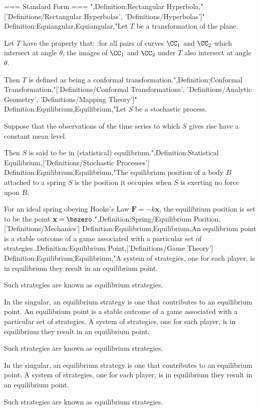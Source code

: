 === Standard Form ===
",Definition:Rectangular Hyperbola,"['Definitions/Rectangular Hyperbolas', 'Definitions/Hyperbolas']"
Definition:Equiangular,Equiangular,"Let $T$ be a transformation of the plane.

Let $T$ have the property that:
:for all pairs of curves $\CC_1$ and $\CC_2$ which intersect at angle $\theta$, the images of $\CC_1$ and $\CC_2$ under $T$ also intersect at angle $\theta$.

Then $T$ is defined as being a conformal transformation.",Definition:Conformal Transformation,"['Definitions/Conformal Transformations', 'Definitions/Analytic Geometry', 'Definitions/Mapping Theory']"
Definition:Equilibrium,Equilibrium,"Let $S$ be a stochastic process.

Suppose that the observations of the time series to which $S$ gives rise have a constant mean level.

Then $S$ is said to be in (statistical) equilibrium.",Definition:Statistical Equilibrium,['Definitions/Stochastic Processes']
Definition:Equilibrium,Equilibrium,"The equilibrium position of a body $B$ attached to a spring $S$ is the position it occupies when $S$ is exerting no force upon $B$.

For an ideal spring obeying Hooke's Law $\mathbf F = -k \mathbf x$, the equilibrium position is set to be the point $\mathbf x = \bszero$.",Definition:Spring/Equilibrium Position,['Definitions/Mechanics']
Definition:Equilibrium,Equilibrium,An equilibrium point is a stable outcome of a game associated with a particular set of strategies.,Definition:Equilibrium Point,['Definitions/Game Theory']
Definition:Equilibrium,Equilibrium,"A system of strategies, one for each player, is in equilibrium  they result in an equilibrium point.

Such strategies are known as equilibrium strategies.


In the singular, an equilibrium strategy is one that contributes to an equilibrium point.
An equilibrium point is a stable outcome of a game associated with a particular set of strategies.
A system of strategies, one for each player, is in equilibrium  they result in an equilibrium point.

Such strategies are known as equilibrium strategies.


In the singular, an equilibrium strategy is one that contributes to an equilibrium point.
A system of strategies, one for each player, is in equilibrium  they result in an equilibrium point.

Such strategies are known as equilibrium strategies.


